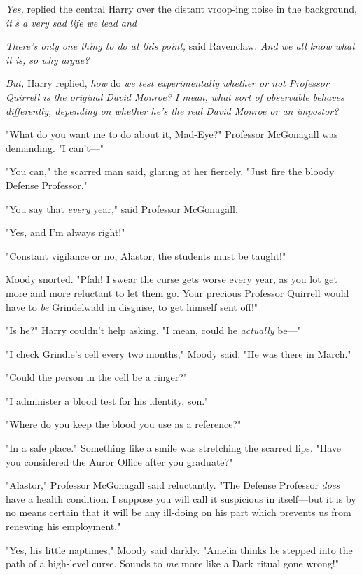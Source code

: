 \emph{Yes,} replied the central Harry over the distant vroop-ing noise in the
background, \emph{it's a very sad life we lead and }

\emph{There's only one thing to do at this point,} said Ravenclaw. \emph{And we
all know what it is, so why argue?}

\emph{But,} Harry replied, \emph{how} do \emph{we test experimentally whether
or not Professor Quirrell is the original David Monroe? I mean, what sort of
observable behaves differently, depending on whether he's the real David Monroe
or an impostor?}

"What do you want me to do about it, Mad-Eye?" Professor McGonagall was
demanding. "I can't\mbox{---}"

"You can," the scarred man said, glaring at her fiercely. "Just fire the bloody
Defense Professor."

"You say that \emph{every} year," said Professor McGonagall.

"Yes, and I'm always right!"

"Constant vigilance or no, Alastor, the students must be taught!"

Moody snorted. "Pfah! I swear the curse gets worse every year, as you lot get
more and more reluctant to let them go. Your precious Professor Quirrell would
have to \emph{be} Grindelwald in disguise, to get himself sent off!"

"Is he?" Harry couldn't help asking. "I mean, could he \emph{actually} be\mbox{---}"

"I check Grindie's cell every two months," Moody said. "He was there in March."

"Could the person in the cell be a ringer?"

"I administer a blood test for his identity, son."

"Where do you keep the blood you use as a reference?"

"In a safe place." Something like a smile was stretching the scarred lips.
"Have you considered the Auror Office after you graduate?"

"Alastor," Professor McGonagall said reluctantly. "The Defense Professor
\emph{does} have a{\el} health condition. I suppose you will call it
suspicious in itself---but it is by no means certain that it will be any
ill-doing on his part which prevents us from renewing his employment."

"Yes, his little naptimes," Moody said darkly. "Amelia thinks he stepped into
the path of a high-level curse. Sounds to \emph{me} more like a Dark ritual
gone wrong!"

